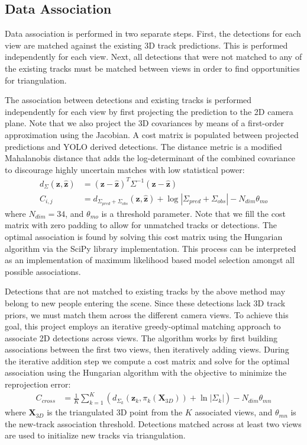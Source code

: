 \subsection{Data Association} \label{arch-assoc}

Data association is performed in two separate steps. First, the detections for each view are matched against the existing 3D track predictions. This is performed independently for each view. Next, all detections that were not matched to any of the existing tracks must be matched between views in order to find opportunities for triangulation.

The association between detections and existing tracks is performed independently for each view by first projecting the prediction to the 2D camera plane. Note that we also project the 3D covariances by means of a first-order approximation using the Jacobian. A cost matrix is populated between projected predictions and YOLO derived detections. The distance metric is a modified Mahalanobis distance that adds the log-determinant of the combined covariance to discourage highly uncertain matches with low statistical power:
\begin{align*}
    d_\Sigma(\mathbf{z}, \hat{\mathbf{z}}) &= (\mathbf{z} - \hat{\mathbf{z}})^T \Sigma^{-1} (\mathbf{z} - \hat{\mathbf{z}}) \\
    C_{i,j} &= d_{\Sigma_{pred} + \Sigma_{obs}}(\mathbf{z}, \hat{\mathbf{z}}) + \log|\Sigma_{pred} + \Sigma_{obs}|  - N_{dim} \theta_{mo}
\end{align*}
where $N_{dim} = 34$, and $\theta_{mo}$ is a threshold parameter. Note that we fill the cost matrix with zero padding to allow for unmatched tracks or detections. The optimal association is found by solving this cost matrix using the Hungarian algorithm  \parencite{kuhn1955hungarian} via the SciPy library \parencite{virtanen2020scipy} implementation. This process can be interpreted as an implementation of maximum likelihood based model selection amongst all possible associations.

Detections that are not matched to existing tracks by the above method may belong to new people entering the scene. Since these detections lack 3D track priors, we must match them across the different camera views. To achieve this goal, this project employs an iterative greedy-optimal matching approach to associate 2D detections across views. The algorithm works by first building associations between the first two views, then iteratively adding views. During the iterative addition step we compute a cost matrix and solve for the optimal association using the Hungarian algorithm with the objective to minimize the reprojection error:
\begin{align*}
    C_{cross} &= \frac{1}{K}\sum_{k=1}^K \left( d_{\Sigma_k}(\mathbf{z}_k, \pi_k(\mathbf{X}_{3D})) + \ln|\Sigma_k| \right) - N_{dim}\theta_{mn}
\end{align*}
where $\mathbf{X}_{3D}$ is the triangulated 3D point from the $K$ associated views, and $\theta_{mn}$ is the new-track association threshold. Detections matched across at least two views are used to initialize new tracks via triangulation.


